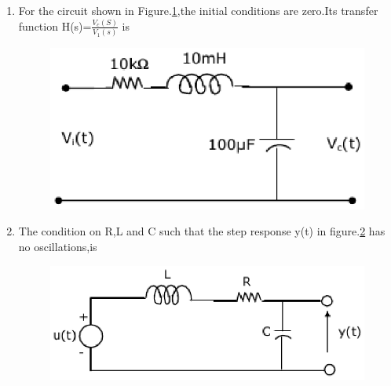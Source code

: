 \documentclass[journal,12pt,twocolumn]{IEEEtran}
\begin{document}
\begin{enumerate}
\item For the circuit shown in Figure.\ref{fig56},the initial conditions are zero.Its transfer function H(s)=$\frac{V_{c}(S)}{V_{1}(s)}$ is
\begin{enumerate}
\setlength\itemsep{2em}
\begin{figure}[!h]
\begin{center}
\includegraphics[scale=0.8]{./figs/fig56.eps}
\caption{}
\label{fig56}
\end{center}
\end{figure}
\end{enumerate}

\item The condition on R,L and C such that the step response y(t) in figure.\ref{fig57} has no oscillations,is
\begin{enumerate}
\setlength\itemsep{2em}
\begin{figure}[!h]
\begin{center}
\includegraphics[scale=0.7]{./figs/fig57.eps}
\caption{}
\label{fig57}
\end{center}
\end{figure}
\end{enumerate}


\end{enumerate}
\end{document}
